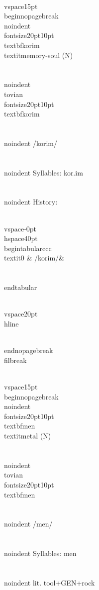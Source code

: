 \\vspace{15pt}
\\begin{nopagebreak}
\\noindent{\\fontsize{20pt}{10pt}\\textbf{korim} } \\textit{memory-soul} (N)\\\\
\\noindent {\\tovian \\fontsize{20pt}{10pt} \\textbf{korim} }\\\\
\\noindent /k{\textprimstress}orim/\\\\
\\noindent Syllables: kor.im\\\\


\\noindent History:

\\vspace{-0pt}
\\hspace{40pt}
\\begin{tabular}{ccc}
\\textit{0} & /korim/& \\\\
\\end{tabular}

\\vspace{20pt}\\hline

\\end{nopagebreak}
\\filbreak



\\vspace{15pt}
\\begin{nopagebreak}
\\noindent{\\fontsize{20pt}{10pt}\\textbf{men} } \\textit{metal} (N)\\\\
\\noindent {\\tovian \\fontsize{20pt}{10pt} \\textbf{men} }\\\\
\\noindent /m{\textprimstress}en/\\\\
\\noindent Syllables: men\\\\
\\noindent lit. tool+GEN+rock\\\\


